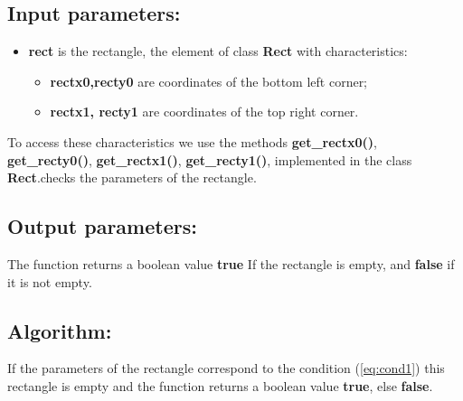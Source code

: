 \documentclass{report}
\begin{document}
\subsection*{Input parameters:}

\begin{itemize}
	\item {\bfseries	rect} is the rectangle, the element of class {\bfseries Rect} with characteristics:
	
	\begin{itemize}
		\item {\bfseries rectx0,recty0} are coordinates of the bottom left corner;
		\item {\bfseries rectx1, recty1} are coordinates of the top right corner.
	\end{itemize}
\end{itemize}

To access these characteristics we use the methods  {\bfseries get\_rectx0()}, {\bfseries get\_recty0()}, {\bfseries get\_rectx1()}, {\bfseries get\_recty1()}, implemented in the class {\bfseries Rect}.checks the parameters  of the rectangle.

\subsection*{Output parameters:}

The function returns a boolean value {\bfseries true} If the rectangle is empty, and {\bfseries false} if it is not empty.

\subsection*{Algorithm:}

If the parameters of the rectangle correspond to the condition (\ref{eq:cond1}) this rectangle is empty and the function returns a boolean value {\bfseries true}, else  {\bfseries false}. 
\end{document}
